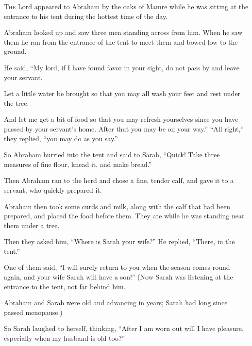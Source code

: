 \begin{scripture}
 \allowchapbreak\hypertarget{ch-genesis-18}{}\lettrine[lines=5]{\color{pentateuch}T}{\textsc{he}} Lord appeared to Abraham by the oaks of Mamre while he was sitting at the entrance to his tent during the hottest time of the day.\everypar{}
 Abraham looked up and saw three men standing across from him. When he saw them he ran from the entrance of the tent to meet them and bowed low to the ground.
\\\indent{} He said, ``My lord, if I have found favor in your sight, do not pass by and leave your servant.
 Let a little water be brought so that you may all wash your feet and rest under the tree.
 And let me get a bit of food so that you may refresh yourselves since you have passed by your servant's home. After that you may be on your way.'' ``All right,'' they replied, ``you may do as you say.''
\everypar{}

 So Abraham hurried into the tent and said to Sarah, ``Quick! Take three measures of fine flour, knead it, and make bread.''
 Then Abraham ran to the herd and chose a fine, tender calf, and gave it to a servant, who quickly prepared it.
 Abraham then took some curds and milk, along with the calf that had been prepared, and placed the food before them. They ate while he was standing near them under a tree.
\everypar{}

 Then they asked him, ``Where is Sarah your wife?'' He replied, ``There, in the tent.''
 One of them said, ``I will surely return to you when the season comes round again, and your wife Sarah will have a son!'' (Now Sarah was listening at the entrance to the tent, not far behind him.
 Abraham and Sarah were old and advancing in years; Sarah had long since passed menopause.)
 So Sarah laughed to herself, thinking, ``After I am worn out will I have pleasure, especially when my husband is old too?''
\everypar{}


\end{scripture}
